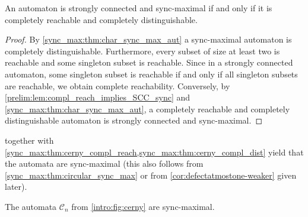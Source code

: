 \begin{corollary}
	\label{sync_max:cor:SCC}
	An automaton is strongly connected and sync-maximal if and only if
	it is completely reachable and 
	completely distinguishable.
\end{corollary}
\begin{proof}
	By \cref{sync_max:thm:char_sync_max_aut}
	a sync-maximal automaton is completely distinguishable.
	Furthermore, every subset of size at least two is reachable
	and some singleton subset is reachable.	
	Since in a strongly connected automaton, some singleton subset is reachable if and only if all singleton subsets are reachable,	we obtain complete reachability.
	Conversely, by \cref{prelim:lem:compl_reach_implies_SCC_sync} and 
	\cref{sync_max:thm:char_sync_max_aut}, a completely reachable
	and completely distinguishable automaton is strongly connected and sync-maximal.
\end{proof}

 together with \cref{sync_max:thm:cerny_compl_reach,sync_max:thm:cerny_compl_dist}
yield that the \Cerny automata are sync-maximal (this also follows from \cref{sync_max:thm:circular_sync_max} or from \cref{cor:defectatmostone-weaker} given later).

\begin{theorem}
	\label{sync_max:thm:cerny_sync_maximal}
	The \Cerny automata $\mathcal C_n$ from \cref{intro:fig:cerny}
	are sync-maximal.
\end{theorem}